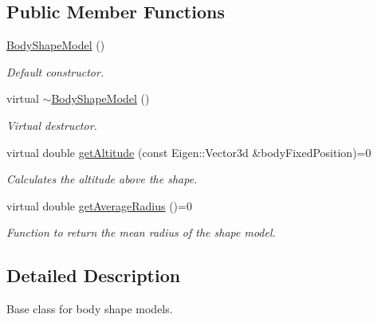 \subsection*{Public Member Functions}
\begin{DoxyCompactItemize}
\item 
\hyperlink{classtudat_1_1basic__astrodynamics_1_1BodyShapeModel_a9afa14876ae1e01c193995c53c443f8e}{Body\+Shape\+Model} ()\hypertarget{classtudat_1_1basic__astrodynamics_1_1BodyShapeModel_a9afa14876ae1e01c193995c53c443f8e}{}\label{classtudat_1_1basic__astrodynamics_1_1BodyShapeModel_a9afa14876ae1e01c193995c53c443f8e}

\begin{DoxyCompactList}\small\item\em Default constructor. \end{DoxyCompactList}\item 
virtual \hyperlink{classtudat_1_1basic__astrodynamics_1_1BodyShapeModel_a614eec798723a1f059436fb033a946ed}{$\sim$\+Body\+Shape\+Model} ()\hypertarget{classtudat_1_1basic__astrodynamics_1_1BodyShapeModel_a614eec798723a1f059436fb033a946ed}{}\label{classtudat_1_1basic__astrodynamics_1_1BodyShapeModel_a614eec798723a1f059436fb033a946ed}

\begin{DoxyCompactList}\small\item\em Virtual destructor. \end{DoxyCompactList}\item 
virtual double \hyperlink{classtudat_1_1basic__astrodynamics_1_1BodyShapeModel_a8439cdf3a6dd14875fb8892341bde3ee}{get\+Altitude} (const Eigen\+::\+Vector3d \&body\+Fixed\+Position)=0
\begin{DoxyCompactList}\small\item\em Calculates the altitude above the shape. \end{DoxyCompactList}\item 
virtual double \hyperlink{classtudat_1_1basic__astrodynamics_1_1BodyShapeModel_a36f348a51efc73a5414d55438d4347eb}{get\+Average\+Radius} ()=0
\begin{DoxyCompactList}\small\item\em Function to return the mean radius of the shape model. \end{DoxyCompactList}\end{DoxyCompactItemize}


\subsection{Detailed Description}
Base class for body shape models. 

